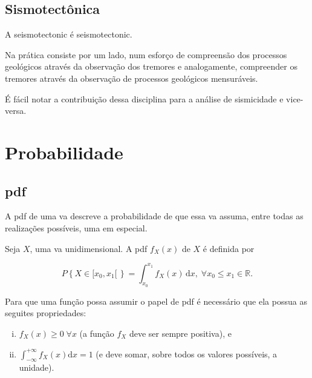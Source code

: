 \subsection{Sismotectônica}
\label{sec:sismotectonica}

A \gls{seismotectonic} é \glsdesc*{seismotectonic}.

Na prática consiste por um lado, num esforço de compreensão dos
processos geológicos através da observação dos tremores e analogamente, compreender os tremores através da observação
de processos geológicos mensuráveis.

É fácil notar a contribuição dessa disciplina para a análise de sismicidade e vice-versa.







\section{Probabilidade}
\label{sec:probabilidade}



\subsection{\Glsdesc{pdf}}
\label{sec:pdf}

A \gls{pdf} de uma \gls{va}
descreve a probabilidade de que essa \gls{va}
assuma, entre todas as realizações possíveis, uma em especial.

Seja $X$, uma \gls{va} unidimensional. A \gls{pdf}
$f_X(x)$ de $X$ é definida por

\begin{equation}
	P \left\{ X \in [x_0,x_1[\, \right\} = \int_{x_0}^{x_1}\!f_X(x)\,\mathrm{d}x, \; \forall x_0 \leq x_1 \in \mathbb{R}.
	\label{eq:pdf}
\end{equation}

Para que uma função possa assumir o papel de \gls{pdf} é necessário que ela
possua as seguites propriedades:
\begin{enumerate}[(i)]
	\item $f_X(x) \ge 0\;\forall x$  (a função $f_X$ deve ser sempre positiva), e
	\item $\int_{-\infty}^{+\infty} f_X(x) \mathrm{d}x = 1$ (e deve somar, sobre todos os valores possíveis, a unidade).
\end{enumerate}


